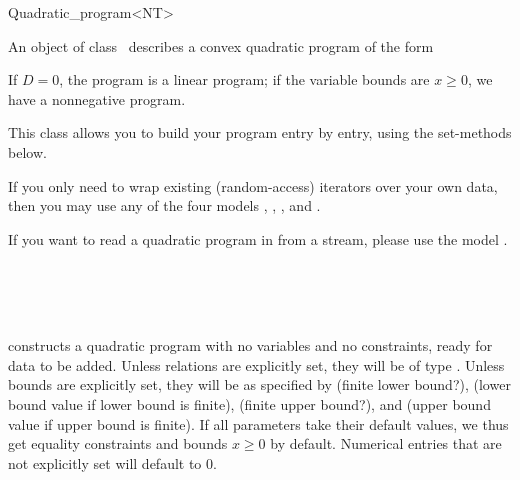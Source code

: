 \begin{ccRefClass}{Quadratic_program<NT>}


\ccDefinition
An object of class \ccRefName\ describes a convex quadratic program of the form


If $D=0$, the program is
a linear program; if the variable bounds are $x\geq 0$, we have a 
nonnegative program.

This class allows you to build your program entry by entry, using
the set-methods below. 

If you only need to wrap existing (random-access)
iterators over your own data, then you may use any of the four models
, 
, 
, and
. 

If you want to read a quadratic program in  from a stream, 
please use the model .

\ccIsModel
{}\\
\\
\\

\ccTypes


\ccCreation
\ccIndexClassCreation
{}

{constructs a quadratic program with no variables and no constraints, ready
for data to be added.  Unless relations are explicitly set, they will 
be of type . Unless bounds are explicitly set, they
will be as specified by  (finite lower bound?), 
 (lower bound value if lower bound is finite),
 (finite upper bound?), and
 (upper bound value if upper bound is finite). If all
parameters take their default values, we thus get equality constraints 
and bounds $x\geq 0$ by default. Numerical entries that are not 
explicitly set will default to $0$.}


\end{ccRefClass}
